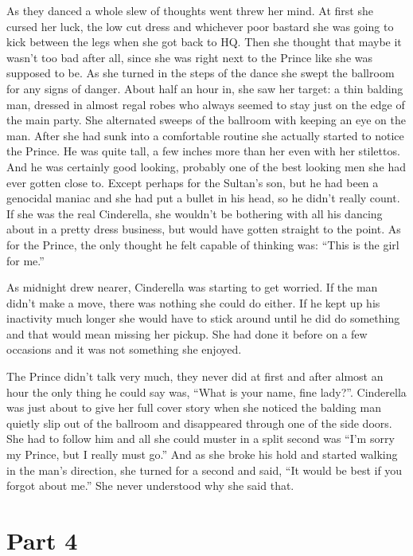 \documentclass[11pt,letterpaper]{article}
\begin{document}
As they danced a whole slew of thoughts went threw her mind. At first she cursed her luck, the low cut dress and whichever poor bastard she was going to kick between the legs when she got back to HQ. Then she thought that maybe it wasn't too bad after all, since she was right next to the Prince like she was supposed to be. As she turned in the steps of the dance she swept the ballroom for any signs of danger. About half an hour in, she saw her target: a thin balding man, dressed in almost regal robes who always seemed to stay just on the edge of the main party. She alternated sweeps of the ballroom with keeping an eye on the man. After she had sunk into a comfortable routine she actually started to notice the Prince. He was quite tall, a few inches more than her even with her stilettos. And he was certainly good looking, probably one of the best looking men she had ever gotten close to. Except perhaps for the Sultan's son, but he had been a genocidal maniac and she had put a bullet in his head, so he didn't really count. If she was the real Cinderella, she wouldn't be bothering with all his dancing about in a pretty dress business, but would have gotten straight to the point. As for the Prince, the only thought he felt capable of thinking was: ``This is the girl for me.''

As midnight drew nearer, Cinderella was starting to get worried. If the man didn't make a move, there was nothing she could do either. If he kept up his inactivity much longer she would have to stick around until he did do something and that would mean missing her pickup. She had done it before on a few occasions and it was not something she enjoyed.

The Prince didn't talk very much, they never did at first and after almost an hour the only thing he could say was, ``What is your name, fine lady?''. Cinderella was just about to give her full cover story when she noticed the balding man quietly slip out of the ballroom and disappeared through one of the side doors. She had to follow him and all she could muster in a split second was ``I'm sorry my Prince, but I really must go.'' And as she broke his hold and started walking in the man's direction, she turned for a second and said, ``It would be best if you forgot about me.'' She never understood why she said that.

\section*{Part 4}
\end{document}
